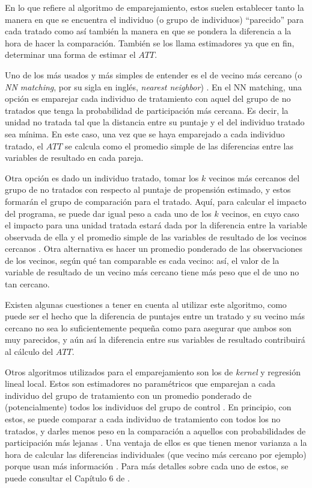 \documentclass[../../main.tex]{subfiles}
\begin{document}
En lo que refiere al algoritmo de emparejamiento, estos suelen establecer tanto la manera
en que se encuentra el individuo (o grupo de individuos) ``parecido'' para cada tratado
como así también la manera en que se pondera la diferencia a la hora de hacer la
comparación. También se los llama estimadores ya que en fin, determinar una forma de
estimar el \(ATT\).

Uno de los más usados y más simples de entender es el de vecino más cercano (o \textit{NN
matching}, por su sigla en inglés, \textit{nearest neighbor}) \cite{bernal}. En el NN
matching, una opción es emparejar cada individuo de tratamiento con aquel del grupo de no
tratados que tenga la probabilidad de participación más cercana. Es decir, la unidad no
tratada tal que la distancia entre su puntaje y el del individuo tratado sea mínima. En
este caso, una vez que se haya emparejado a cada individuo tratado, el \(ATT\) se calcula
como el promedio simple de las diferencias entre las variables de resultado en cada
pareja.

Otra opción es dado un individuo tratado, tomar los \(k\) vecinos más cercanos del grupo
de no tratados con respecto al puntaje de propensión estimado, y estos formarán el grupo
de comparación para el tratado. Aquí, para calcular el impacto del programa, se puede dar
igual peso a cada uno de los \(k\) vecinos, en cuyo caso el impacto para una unidad
tratada estará dada por la diferencia entre la variable observada de ella y el promedio
simple de las variables de resultado de los vecinos cercanos \cite{bernal}. Otra
alternativa es hacer un promedio ponderado de las observaciones de los vecinos, según qué
tan comparable es cada vecino: así, el valor de la variable de resultado de un vecino más
cercano tiene más peso que el de uno no tan cercano.

Existen algunas cuestiones a tener en cuenta al utilizar este algoritmo, como puede ser
el hecho que la diferencia de puntajes entre un tratado y su vecino más cercano no
sea lo suficientemente pequeña como para asegurar que ambos son muy parecidos, y aún
así la diferencia entre sus variables de resultado contribuirá al cálculo del \(ATT\).

Otros algoritmos utilizados para el emparejamiento son los de \textit{kernel} y regresión
lineal local. Estos son estimadores no paramétricos que emparejan a cada individuo del
grupo de tratamiento con un promedio ponderado de (potencialmente) todos los individuos
del grupo de control \cite{bernal}. En principio, con estos, se puede comparar a cada
individuo de tratamiento con todos los no tratados, y darles menos peso en la comparación
a aquellos con probabilidades de participación más lejanas \cite{bernal}. Una ventaja de
ellos es que tienen menor varianza a la hora de calcular las diferencias individuales (que
vecino más cercano por ejemplo) porque usan más información \cite{bernal}. Para
más detalles sobre cada uno de estos, se puede consultar el Capítulo 6 de \cite{bernal}.
\end{document}
